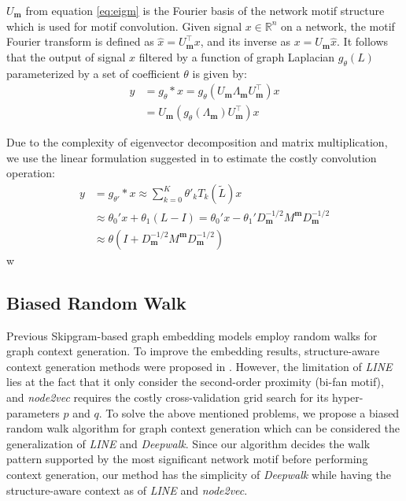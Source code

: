 \documentclass{article}
\theoremstyle{definition}
\begin{document}
$U_{\mathbf{m}}$ from equation \ref{eq:eigm} is the Fourier basis of the 
network motif structure which is used for motif convolution. Given signal
$x \in \mathds{R}^n$ on a network, the motif Fourier transform is defined
as $\hat{x} = U_{\mathbf{m}}^{\top}x$, and its inverse as 
$x = U_{\mathbf{m}}\hat{x}$. It follows that the output of signal $x$
filtered by a function of graph Laplacian $g_{\theta}(L)$ parameterized
by a set of coefficient $\theta$ is given by:
\begin{equation}
\begin{aligned}
y &= g_{\theta} \ast x =  g_\theta (U_{\mathbf{m}} \Lambda_{\mathbf{m}} U_{\mathbf{m}}^\top) x \\
&= U_{\mathbf{m}} (g_\theta(\Lambda_{\mathbf{m}}) U^\top_{\mathbf{m}})x
\end{aligned}
\label{eq:filter}
\end{equation}   

Due to the complexity of eigenvector decomposition and matrix 
multiplication, we use the linear formulation suggested in \cite{gcn} to 
estimate the costly convolution operation: 
\begin{equation} \label{eq:linear}
\begin{aligned}
y &= g_{\theta'} \ast x \approx \sum_{k=0}^K \theta'_k T_k(\tilde{L})x \\
&\approx \theta_0' x + \theta_1 (L - I) = \theta_0' x - \theta_1' D^{-1/2}_{\mathbf{m}}
M^{\mathbf{m}}D^{-1/2}_{\mathbf{m}} \\
&\approx \theta \left( I + D^{-1/2}_{\mathbf{m}}
M^{\mathbf{m}}D^{-1/2}_{\mathbf{m}} \right)
\end{aligned}
\end{equation} w

\subsection{Biased Random Walk}

Previous Skipgram-based graph embedding models employ random
walks for graph context generation. To improve the embedding results,
structure-aware context generation methods were proposed in 
\cite{line,node2vec}. However, the limitation of \emph{LINE} lies at the 
fact that it only consider the second-order proximity (bi-fan motif), and  
\emph{node2vec} requires the costly cross-validation grid search for its hyper-
parameters $p$ and $q$. To solve the above mentioned problems, we propose 
a biased random walk algorithm for graph context generation which can be 
considered the generalization of \emph{LINE} and \emph{Deepwalk}. Since 
our algorithm decides the walk pattern supported by the most significant 
network motif before performing context generation, our method has the 
simplicity of \emph{Deepwalk} while having the structure-aware context as 
of \emph{LINE} and \emph{node2vec}.
\end{document}
